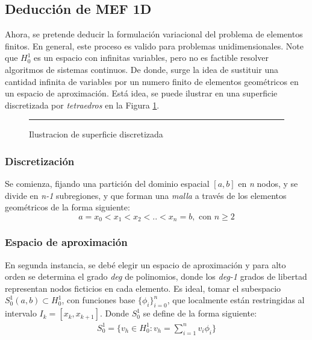 \documentclass[12pt]{article}
\begin{document}
\subsection{Deducción de MEF 1D}
Ahora, se pretende deducir la formulación variacional del problema de elementos finitos. En general, este proceso es valido para problemas unidimensionales. Note que $H^1_0$ es un espacio con infinitas variables, pero no es factible resolver algoritmos de sistemas continuos. De donde, surge la idea de sustituir una cantidad infinita de variables por un numero finito de elementos geométricos en un espacio de aproximación. Está idea, se puede ilustrar en una superficie discretizada por \textit{tetraedros} en la Figura \ref{malla01}. 
\begin{figure}[h]
		{\LARGE
		\centering
		}
\caption{Ilustracion de superficie discretizada}
\hrule
\label{malla01}
\end{figure}
\subsubsection{Discretización}
Se comienza, fijando una partición del dominio espacial $[a,b]$ en \textit{n} nodos, y se divide en \textit{n-1} subregiones, y que forman una \textit{malla} a través de los elementos geométricos de la forma siguiente:
\[ a=x_0 < x_1 < x_2 < .. < x_n=b, \text{ con }n\geq2 \]

\subsubsection{Espacio de aproximación}
En segunda instancia, se debé elegir un espacio de aproximación
y para alto orden se determina el grado \textit{deg} de polinomios, donde los \textit{deg-1} grados de libertad representan nodos ficticios en cada elemento. Es ideal, tomar el subespacio $S^1_0(a,b) \subset H^1_0$, con funciones base $\{\phi_i\}_{i=0}^n$, que localmente están restringidas al intervalo $I_k=[x_k,x_{k+1}]$. Donde $S^1_0$ se define de la forma siguiente:
\begin{equation*}
\begin{array}{c}
S^1_0 = \{ v_h \in H^1_0 : v_h=\sum^{n}_{i=1}v_i\phi_i\}
\end{array}
\end{equation*} 
\end{document}
